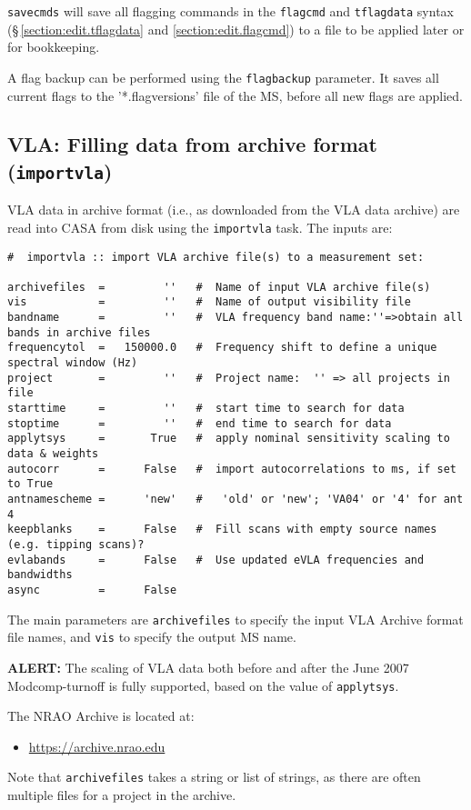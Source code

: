 {\tt savecmds} will save all flagging commands in the {\tt flagcmd}
and {\tt tflagdata} syntax (\S\,\ref{section:edit.tflagdata} and
\ref{section:edit.flagcmd}) to a file to be applied later or for
bookkeeping. 

A flag backup can be performed using the {\tt flagbackup}
parameter. It saves all current flags to the '*.flagversions' file of
the MS, before all new flags are applied.


\subsection{VLA: Filling data from archive format ({\tt importvla})}
\label{section:io.import.vla}

VLA data in archive format (i.e., as downloaded from the VLA data archive)
are read into CASA from disk using the {\tt importvla} task.  The inputs are:
\small
\begin{verbatim}
#  importvla :: import VLA archive file(s) to a measurement set:

archivefiles  =         ''   #  Name of input VLA archive file(s)
vis           =         ''   #  Name of output visibility file
bandname      =         ''   #  VLA frequency band name:''=>obtain all bands in archive files
frequencytol  =   150000.0   #  Frequency shift to define a unique spectral window (Hz)
project       =         ''   #  Project name:  '' => all projects in file
starttime     =         ''   #  start time to search for data
stoptime      =         ''   #  end time to search for data
applytsys     =       True   #  apply nominal sensitivity scaling to data & weights
autocorr      =      False   #  import autocorrelations to ms, if set to True
antnamescheme =      'new'   #   'old' or 'new'; 'VA04' or '4' for ant 4
keepblanks    =      False   #  Fill scans with empty source names (e.g. tipping scans)?
evlabands     =      False   #  Use updated eVLA frequencies and bandwidths
async         =      False        
\end{verbatim}
\normalsize

The main parameters are {\tt archivefiles} to specify the input
VLA Archive format file names, and {\tt vis} to specify the output
MS name. 

{\bf ALERT:} The scaling of VLA data both before and after the
June 2007 Modcomp-turnoff is fully supported, based on the value of
{\tt applytsys}.  

The NRAO Archive is located at:
\begin{itemize}
  \item \url{https://archive.nrao.edu}
\end{itemize}
Note that {\tt archivefiles} takes a string or list of
strings, as there are often multiple files for a project in the
archive.

